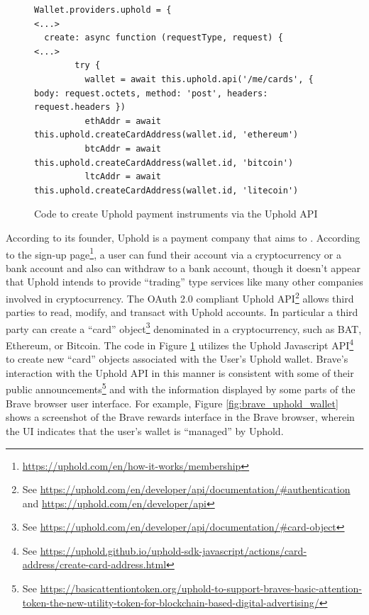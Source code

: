 \documentclass[sigconf]{acmart}
\begin{document}
\begin{figure}
\begin{lstlisting}
Wallet.providers.uphold = {
<...>
  create: async function (requestType, request) {
<...>
        try {
          wallet = await this.uphold.api('/me/cards', { body: request.octets, method: 'post', headers: request.headers })
          ethAddr = await this.uphold.createCardAddress(wallet.id, 'ethereum')
          btcAddr = await this.uphold.createCardAddress(wallet.id, 'bitcoin')
          ltcAddr = await this.uphold.createCardAddress(wallet.id, 'litecoin')
\end{lstlisting}
\caption{Code to create Uphold payment instruments via the Uphold API}
\label{fig:code_uphold_wallet_create}
\end{figure}
According to its founder,
Uphold is a payment company that
aims to
\cite{fortune-uphold}.
According to the sign-up page\footnote{\url{https://uphold.com/en/how-it-works/membership}},
a user can fund their account via a cryptocurrency
or a bank account and also can withdraw to a bank account,
though it doesn't appear that Uphold intends to
provide ``trading'' type services like many other
companies involved in cryptocurrency.
The OAuth 2.0 compliant Uphold API\footnote{See \url{https://uphold.com/en/developer/api/documentation/\#authentication} and \url{https://uphold.com/en/developer/api}}
allows third parties to read, modify, and transact with
Uphold accounts. In particular a third party
can create a ``card'' object\footnote{See \url{https://uphold.com/en/developer/api/documentation/\#card-object}}
denominated in a cryptocurrency, such as BAT, Ethereum, or Bitcoin.
The code in Figure \ref{fig:code_uphold_wallet_create}
utilizes the Uphold Javascript API\footnote{See \url{https://uphold.github.io/uphold-sdk-javascript/actions/card-address/create-card-address.html}}
to create new ``card'' objects associated with the User's
Uphold wallet.
Brave's interaction with the Uphold API in this manner is
consistent with some of their public announcements\footnote{See \url{https://basicattentiontoken.org/uphold-to-support-braves-basic-attention-token-the-new-utility-token-for-blockchain-based-digital-advertising/}}
and with the information displayed by some parts
of the Brave browser user interface.
For example, Figure \ref{fig:brave_uphold_wallet} shows a screenshot of the 
Brave rewards interface in the Brave browser,
wherein the UI indicates that the user's wallet
is ``managed'' by Uphold.
\end{document}
